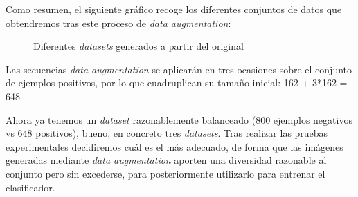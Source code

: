 

Como resumen, el siguiente gráfico recoge los diferentes conjuntos de datos que obtendremos tras este proceso de \textit{data augmentation}:
\begin{figure}[H]
\centering
    \caption{Diferentes \textit{datasets} generados a partir del original} 
\end{figure}

Las secuencias \textit{data augmentation} se aplicarán en tres ocasiones sobre el conjunto de ejemplos positivos, por lo que cuadruplican su tamaño inicial: 162 + 3*162 = 648

Ahora ya tenemos un \textit{dataset} razonablemente balanceado (800 ejemplos negativos vs 648 positivos), bueno, en concreto tres \textit{datasets}. Tras realizar las pruebas experimentales decidiremos cuál es el más adecuado, de forma que las imágenes generadas mediante \textit{data augmentation} aporten una diversidad razonable al conjunto pero sin excederse, para posteriormente utilizarlo para entrenar el clasificador.



